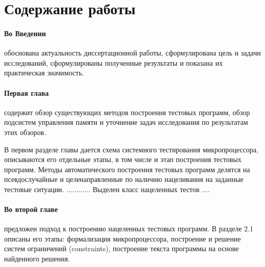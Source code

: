\documentclass[14pt,autoref,href
,facsimile
]{disser}
\begin{document}
%
%


\section*{Содержание работы}

\paragraph{Во Введении} обоснована актуальность диссертационной работы,
сформулирована цель и задачи исследований, сформулированы полученные результаты и показана их
практическая значимость.

%
%


\paragraph{Первая глава} содержит обзор существующих методов построения тестовых программ, обзор подсистем управления памяти и уточнение задач исследования по результатам этих обзоров.

В первом разделе главы дается схема системного тестирования микропроцессора, описываются его отдельные этапы, в том числе и этап построения тестовых программ. Методы автоматического построения тестовых программ делятся на псевдослучайные и целенаправленные по наличию нацеливания на заданные тестовые ситуации. ............ Выделен класс нацеленных тестов ....

\paragraph{Во второй главе} предложен подход к построению нацеленных тестовых программ. В разделе 2.1 описаны его этапы: формализация микропроцессора, построение и решение систем ограничений (constraints), построение текста программы на основе найденного решения.
\end{document}
